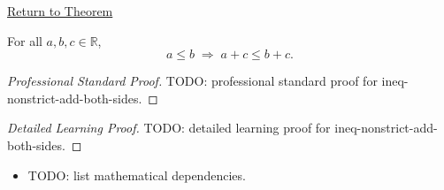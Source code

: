 \newpage
{}
\label{prf:ineq-nonstrict-add-both-sides}

\begin{remark*}[Return]
\hyperref[thm:ineq-nonstrict-add-both-sides]{Return to Theorem}
\end{remark*}

\begin{theorem*}
For all $a, b, c \in \mathbb{R}$,
\[
  a \le b \;\Rightarrow\; a + c \le b + c.
\]
\end{theorem*}

\begin{proof}[Professional Standard Proof]
\LRAProofBodyStart
TODO: professional standard proof for ineq-nonstrict-add-both-sides.
\end{proof}

\begin{proof}[Detailed Learning Proof]
\LRAProofBodyStart
TODO: detailed learning proof for ineq-nonstrict-add-both-sides.
\end{proof}

\begin{remark*}
\end{remark*}

\begin{dependencies}
\begin{itemize}
  \item TODO: list mathematical dependencies.
\end{itemize}
\end{dependencies}

\clearpage
